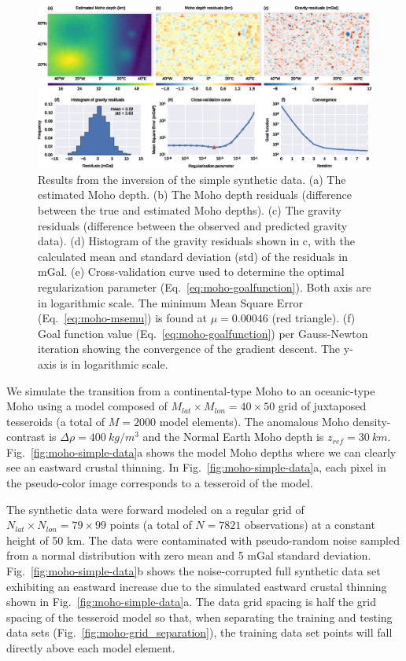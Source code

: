 \begin{figure}
    \centering
    \includegraphics[width=\textwidth]{figures/paper-moho/synthetic-simple-results}
    \caption{
        Results from the inversion of the simple synthetic data.
        (a) The estimated Moho depth.
        (b) The Moho depth residuals (difference between the true and estimated
        Moho depths).
        (c) The gravity residuals (difference between the observed and
        predicted gravity data).
        (d) Histogram of the gravity residuals shown in c, with the calculated
        mean and standard deviation (std) of the residuals in mGal.
        (e) Cross-validation curve used to determine the optimal regularization
        parameter (Eq.~\ref{eq:moho-goalfunction}).
        Both axis are in logarithmic scale.
        The minimum Mean Square Error (Eq.~\ref{eq:moho-msemu}) is found at
        $\mu = 0.00046$ (red triangle).
        (f) Goal function value (Eq.~\ref{eq:moho-goalfunction}) per Gauss-Newton
        iteration showing the convergence of the gradient descent.
        The y-axis is in logarithmic scale.
    }
    \label{fig:moho-simple-results}
\end{figure}

We simulate the transition from a continental-type Moho to an oceanic-type Moho
using a model composed of $M_{lat} \times M_{lon} = 40 \times 50$ grid of
juxtaposed tesseroids (a total of $M = 2000$ model elements).
The anomalous Moho density-contrast is $\Delta\rho = 400\ kg/m^3$
and the Normal Earth Moho depth is $z_{ref} = 30\ km$.
Fig.~\ref{fig:moho-simple-data}a shows the model Moho depths where we can clearly
see an eastward crustal thinning.
In Fig.~\ref{fig:moho-simple-data}a, each pixel in the pseudo-color image
corresponds to a tesseroid of the model.

The synthetic data were forward modeled on a regular grid of
$N_{lat} \times N_{lon} = 79 \times 99$ points
(a total of $N = 7821$ observations)
at a constant height of 50 km.
The data were contaminated with pseudo-random noise
sampled from a normal distribution with zero mean and 5 mGal standard deviation.
Fig.~\ref{fig:moho-simple-data}b shows the noise-corrupted full synthetic data set
exhibiting an eastward increase due to the simulated eastward
crustal thinning shown in Fig.~\ref{fig:moho-simple-data}a.
The data grid spacing is half the grid spacing of the tesseroid model
so that, when separating the training and testing data sets
(Fig.~\ref{fig:moho-grid_separation}),
the training data set points will fall directly above each model element.

